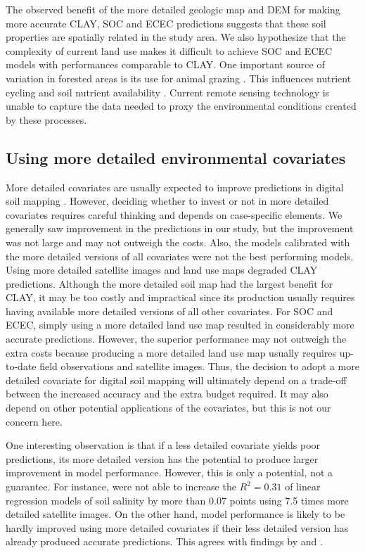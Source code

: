 The observed benefit of the more detailed geologic map and DEM for making more accurate CLAY, SOC and ECEC 
predictions suggests that these soil properties are spatially related in the study area. We also hypothesize 
that the complexity of current land use makes it difficult to achieve SOC and ECEC models with 
performances comparable to CLAY. One important source of variation in forested areas is its use for animal 
grazing \cite{SamuelRosaEtAl2011a}. This influences nutrient cycling and soil nutrient availability 
\cite{SchramaEtAl2013}. Current remote sensing technology is unable to capture the data needed to proxy the 
environmental conditions created by these processes.

\subsection{Using more detailed environmental covariates}

More detailed covariates are usually expected to improve predictions in digital soil mapping 
\cite{CavazziEtAl2013, MaynardEtAl2014}. However, deciding whether to invest or not in more detailed 
covariates requires careful thinking and depends on case-specific elements. We generally saw improvement in 
the predictions in our study, but the improvement was not large and may not outweigh the costs. Also, the 
models calibrated with the more detailed versions of all covariates were not the best performing models. Using 
more detailed satellite images and land use maps degraded CLAY predictions. Although the more detailed
soil map had the largest benefit for CLAY, it may be too costly and impractical since its production usually 
requires having available more detailed versions of all other covariates. For SOC and ECEC, simply using a more 
detailed land use map resulted in considerably more accurate predictions. However, the superior performance may 
not outweigh the extra costs because producing a more detailed land use map usually requires up-to-date field 
observations and satellite images. Thus, the decision to adopt a more detailed covariate for digital soil 
mapping will ultimately depend on a trade-off between the increased accuracy and the extra budget required. It 
may also depend on other potential applications of the covariates, but this is not our concern here.

One interesting observation is that if a less detailed covariate yields poor predictions, its more detailed 
version has the potential to produce larger improvement in model performance. However, this is only a 
potential, not a guarantee. For instance,  were not able to increase the $R^2 = 
0.31$ of linear regression models of soil salinity by more than 0.07 points using 7.5 times more detailed 
satellite images. On the other hand, model performance is likely to be hardly improved using more detailed 
covariates if their less detailed version has already produced accurate predictions. This agrees with findings 
by  and .

